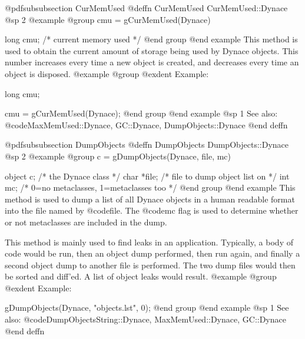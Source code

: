 @pdfsubsubsection {CurMemUsed}
@deffn {CurMemUsed} CurMemUsed::Dynace
@sp 2
@example
@group
cmu = gCurMemUsed(Dynace)

long    cmu;    /*  current memory used  */
@end group
@end example
This method is used to obtain the current amount of storage being used
by Dynace objects.  This number increases every time a new object is
created, and decreases every time an object is disposed.
@example
@group
@exdent Example:

long    cmu;

cmu = gCurMemUsed(Dynace);
@end group
@end example
@sp 1
See also:  @code{MaxMemUsed::Dynace, GC::Dynace, DumpObjects::Dynace}
@end deffn















@pdfsubsubsection {DumpObjects}
@deffn {DumpObjects} DumpObjects::Dynace
@sp 2
@example
@group
c = gDumpObjects(Dynace, file, mc)

object  c;      /*  the Dynace class  */
char    *file;  /*  file to dump object list on  */
int     mc;     /*  0=no metaclasses, 1=metaclasses too  */
@end group
@end example
This method is used to dump a list of all Dynace objects in a human
readable format into the file named by @code{file}.  The @code{mc}
flag is used to determine whether or not metaclasses are included
in the dump.

This method is mainly used to find leaks in an application.  Typically,
a body of code would be run, then an object dump performed, then run again,
and finally a second object dump to another file is performed.  The two
dump files would then be sorted and diff'ed.  A list of object leaks
would result.
@example
@group
@exdent Example:

gDumpObjects(Dynace, "objects.lst", 0);
@end group
@end example
@sp 1
See also:  @code{DumpObjectsString::Dynace, MaxMemUsed::Dynace, GC::Dynace}
@end deffn


























